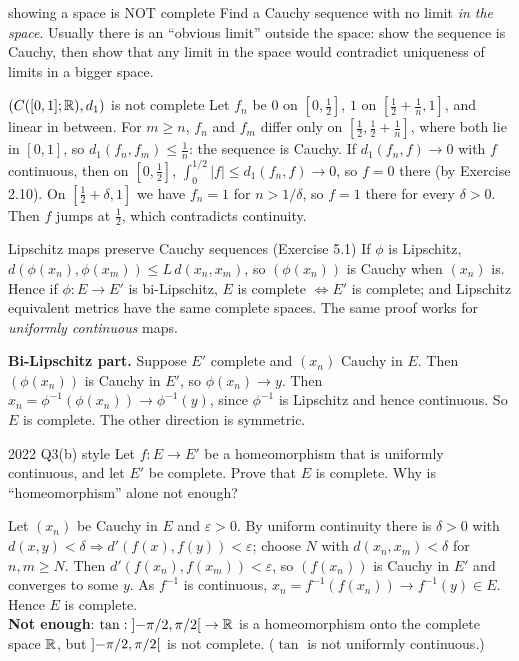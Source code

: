 \begin{steps}{showing a space is NOT complete}
Find a Cauchy sequence with no limit \emph{in the space}. Usually there is an ``obvious limit''
outside the space: show the sequence is Cauchy, then show that any limit in the space would
contradict uniqueness of limits in a bigger space.
\end{steps}

\begin{example}{$(C([0,1];\mathbb R),d_1)$ is not complete}
Let $f_n$ be $0$ on $[0,\frac12]$, $1$ on $[\frac12+\frac1n,1]$, and linear in between.
For $m\ge n$, $f_n$ and $f_m$ differ only on $[\frac12,\frac12+\frac1n]$, where both lie in
$[0,1]$, so $d_1(f_n,f_m)\le\frac1n$: the sequence is Cauchy. If $d_1(f_n,f)\to0$ with $f$
continuous, then on $[0,\frac12]$, $\int_0^{1/2}|f|\le d_1(f_n,f)\to0$, so $f=0$ there (by
Exercise 2.10). On $[\frac12+\delta,1]$ we have $f_n=1$ for $n>1/\delta$, so $f=1$ there for
every $\delta>0$. Then $f$ jumps at $\frac12$, which contradicts continuity.
\end{example}

\begin{thm}{Lipschitz maps preserve Cauchy sequences (Exercise 5.1)}
If $\phi$ is Lipschitz, $d(\phi(x_n),\phi(x_m))\le L\,d(x_n,x_m)$, so $(\phi(x_n))$ is Cauchy when
$(x_n)$ is. Hence if $\phi:E\to E'$ is bi-Lipschitz, $E$ is complete $\iff E'$ is complete; and
Lipschitz equivalent metrics have the same complete spaces. The same proof works for
\emph{uniformly continuous} maps.
\end{thm}
\begin{answer}
\textbf{Bi-Lipschitz part.} Suppose $E'$ complete and $(x_n)$ Cauchy in $E$. Then $(\phi(x_n))$
is Cauchy in $E'$, so $\phi(x_n)\to y$. Then $x_n=\phi^{-1}(\phi(x_n))\to\phi^{-1}(y)$, since
$\phi^{-1}$ is Lipschitz and hence continuous. So $E$ is complete. The other direction is
symmetric.
\end{answer}

\begin{exam}{2022 Q3(b) style}
Let $f:E\to E'$ be a homeomorphism that is uniformly continuous, and let $E'$ be complete. Prove
that $E$ is complete. Why is ``homeomorphism'' alone not enough?
\end{exam}
\begin{answer}
Let $(x_n)$ be Cauchy in $E$ and $\varepsilon>0$. By uniform continuity there is $\delta>0$ with
$d(x,y)<\delta\Rightarrow d'(f(x),f(y))<\varepsilon$; choose $N$ with $d(x_n,x_m)<\delta$ for
$n,m\ge N$. Then $d'(f(x_n),f(x_m))<\varepsilon$, so $(f(x_n))$ is Cauchy in $E'$ and converges
to some $y$. As $f^{-1}$ is continuous, $x_n=f^{-1}(f(x_n))\to f^{-1}(y)\in E$. Hence $E$ is
complete.\\
\textbf{Not enough}: $\tan:\mathopen{]}-\pi/2,\pi/2\mathclose{[}\to\mathbb R$ is a homeomorphism onto the complete space
$\mathbb R$, but $\mathopen{]}-\pi/2,\pi/2\mathclose{[}$ is not complete. ($\tan$ is not uniformly continuous.)
\end{answer}


